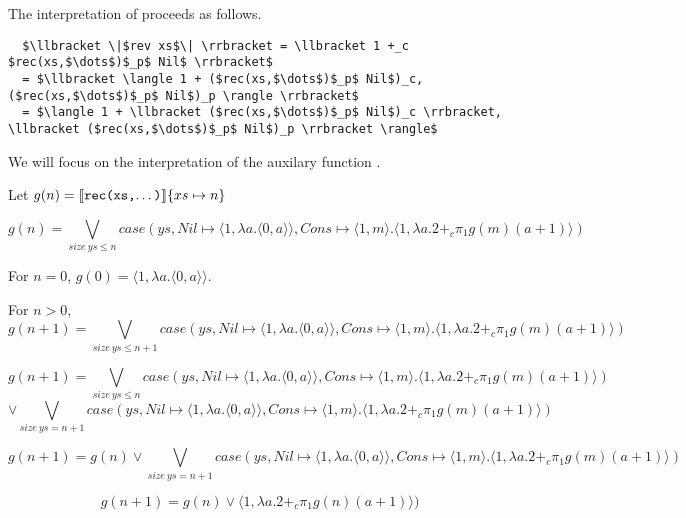 The interpretation of  proceeds as follows.
\begin{lstlisting}
  $\llbracket \|$rev xs$\| \rrbracket = \llbracket 1 +_c $rec(xs,$\dots$)$_p$ Nil$ \rrbracket$
  = $\llbracket \langle 1 + ($rec(xs,$\dots$)$_p$ Nil$)_c, ($rec(xs,$\dots$)$_p$ Nil$)_p \rangle \rrbracket$
  = $\langle 1 + \llbracket ($rec(xs,$\dots$)$_p$ Nil$)_c \rrbracket, \llbracket ($rec(xs,$\dots$)$_p$ Nil$)_p \rrbracket \rangle$
\end{lstlisting}

We will focus on the interpretation of the auxilary function .

Let $g(n) = \llbracket \texttt{rec(xs,$\dots$)} \rrbracket \{xs \mapsto n\}$

\[g(n) = \bigvee_{size\ ys \leq n} case(ys, Nil \mapsto \langle1,\lambda a.\langle 0,a\rangle\rangle, Cons \mapsto \langle 1,m \rangle.\langle 1, \lambda a. 2 +_c \pi_1g(m) (a+1)\rangle)\]

For $n=0$, $g(0) = \langle 1,\lambda a.\langle 0,a\rangle\rangle$.

For $n>0$,
\[g(n+1) = \bigvee_{size\ ys \leq n+1} case(ys, Nil \mapsto \langle1,\lambda a.\langle 0,a\rangle\rangle, Cons \mapsto \langle 1,m \rangle.\langle 1, \lambda a. 2 +_c \pi_1g(m) (a+1)\rangle)\]

\[ g(n+1) = \bigvee_{size\ ys \leq n} case(ys, Nil \mapsto \langle1,\lambda a.\langle 0,a\rangle\rangle, Cons \mapsto \langle 1,m \rangle.\langle 1, \lambda a. 2 +_c \pi_1g(m) (a+1)\rangle) \]
\[ \vee \bigvee_{size\ ys = n+1} case(ys, Nil \mapsto \langle1,\lambda a.\langle 0,a\rangle\rangle, Cons \mapsto \langle 1,m \rangle.\langle 1, \lambda a. 2 +_c \pi_1g(m) (a+1)\rangle) \]
 
\[ g(n+1) = g(n) \vee \bigvee_{size\ ys = n+1} case(ys, Nil \mapsto \langle1,\lambda a.\langle 0,a\rangle\rangle, Cons \mapsto \langle 1,m \rangle.\langle 1, \lambda a. 2 +_c \pi_1g(m) (a+1)\rangle) \]

\[ g(n+1) = g(n) \vee \langle 1, \lambda a. 2 +_c \pi_1g(n) (a+1)\rangle)\]


